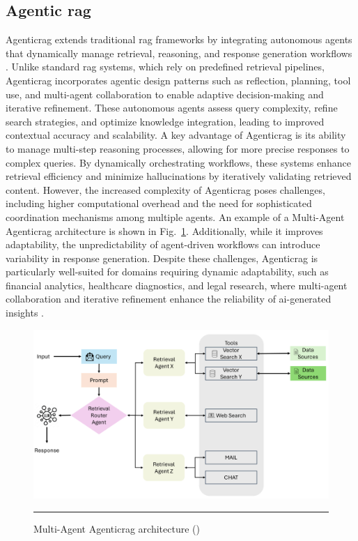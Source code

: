 \subsection*{Agentic \gls{rag}}\label{sec:agentic-rag}
Agentic\gls{rag} extends traditional \gls{rag} frameworks by integrating autonomous agents that dynamically manage retrieval, reasoning, and response generation workflows \cite{singh2025}.
Unlike standard \gls{rag} systems, which rely on predefined retrieval pipelines, Agentic\gls{rag} incorporates agentic design patterns such as reflection, planning, tool use, and multi-agent collaboration to enable adaptive decision-making and iterative refinement.
These autonomous agents assess query complexity, refine search strategies, and optimize knowledge integration, leading to improved contextual accuracy and scalability.
A key advantage of Agentic\gls{rag} is its ability to manage multi-step reasoning processes, allowing for more precise responses to complex queries.
By dynamically orchestrating workflows, these systems enhance retrieval efficiency and minimize hallucinations by iteratively validating retrieved content.
However, the increased complexity of Agentic\gls{rag} poses challenges, including higher computational overhead and the need for sophisticated coordination mechanisms among multiple agents.
An example of a Multi-Agent Agentic\gls{rag} architecture is shown in Fig.~\ref{fig:multi-agent-agentic-rag}.
Additionally, while it improves adaptability, the unpredictability of agent-driven workflows can introduce variability in response generation.
Despite these challenges, Agentic\gls{rag} is particularly well-suited for domains requiring dynamic adaptability, such as financial analytics, healthcare diagnostics, and legal research, where multi-agent collaboration and iterative refinement enhance the reliability of \gls{ai}-generated insights \cite{singh2025}.

\begin{figure}[htbp]
    \centering
 \includegraphics[width=.8\textwidth]{figures/literature-review/multi-agent-agentic-rag.png}
     \rule{35em}{0.5pt}
    \caption{Multi-Agent Agentic\gls{rag} architecture (\textcite{singh2025})}
 \label{fig:multi-agent-agentic-rag}
\end{figure}

